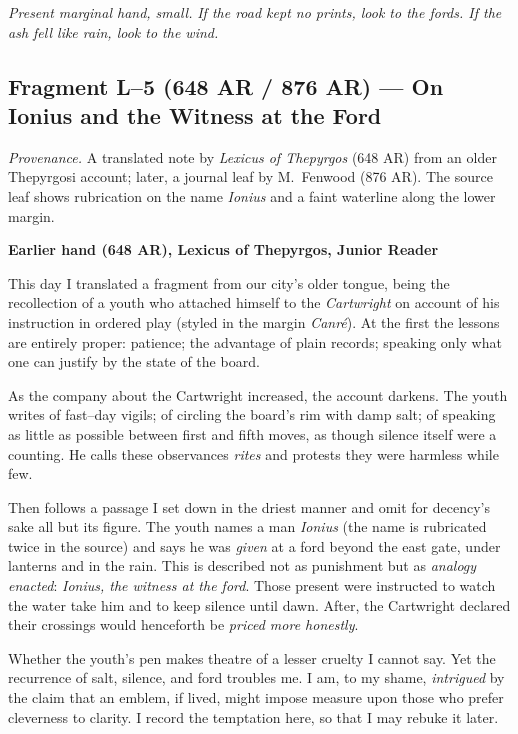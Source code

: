 \documentclass[11pt]{article}
\begin{document}
\medskip
\noindent\textit{Present marginal hand, small.} \emph{If the road kept no prints, look to the fords. If the ash fell like rain, look to the wind.}
\subsection{Fragment L--5 (648 AR / 876 AR) — On Ionius and the Witness at the Ford}
\label{frag:l5}

\noindent\textit{Provenance.} A translated note by \textit{Lexicus of Thepyrgos} (648 AR) from an older Thepyrgosi account; later, a journal leaf by M.\ Fenwood (876 AR). The source leaf shows rubrication on the name \emph{Ionius} and a faint waterline along the lower margin.

\medskip
\noindent\textbf{Earlier hand (648 AR), Lexicus of Thepyrgos, Junior Reader}

This day I translated a fragment from our city’s older tongue, being the recollection of a youth who attached himself to the \textit{Cartwright} on account of his instruction in ordered play (styled in the margin \textit{Canr\'e}). At the first the lessons are entirely proper: patience; the advantage of plain records; speaking only what one can justify by the state of the board.

As the company about the Cartwright increased, the account darkens. The youth writes of fast–day vigils; of circling the board’s rim with damp salt; of speaking as little as possible between first and fifth moves, as though silence itself were a counting. He calls these observances \textit{rites} and protests they were harmless while few.

Then follows a passage I set down in the driest manner and omit for decency’s sake all but its figure. The youth names a man \emph{Ionius} (the name is rubricated twice in the source) and says he was \emph{given} at a ford beyond the east gate, under lanterns and in the rain. This is described not as punishment but as \emph{analogy enacted}: \textit{Ionius, the witness at the ford}. Those present were instructed to watch the water take him and to keep silence until dawn. After, the Cartwright declared their crossings would henceforth be \emph{priced more honestly}.

Whether the youth’s pen makes theatre of a lesser cruelty I cannot say. Yet the recurrence of salt, silence, and ford troubles me. I am, to my shame, \emph{intrigued} by the claim that an emblem, if lived, might impose measure upon those who prefer cleverness to clarity. I record the temptation here, so that I may rebuke it later.
\end{document}
